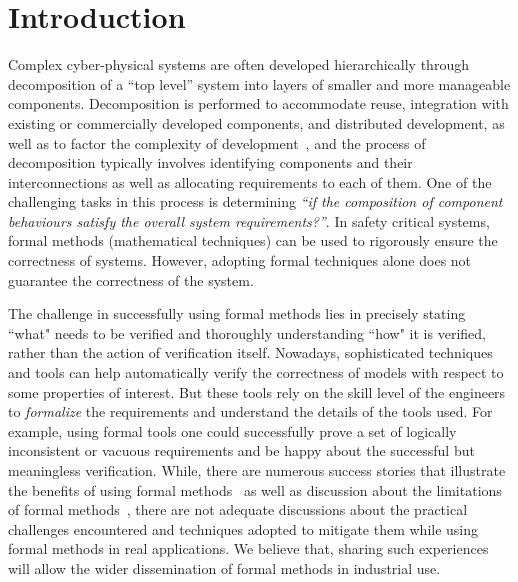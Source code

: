 \section{Introduction}
\label{sec:intro}

Complex cyber-physical systems are often developed hierarchically through decomposition of a ``top level'' system into layers of smaller and more manageable components.  Decomposition is performed to accommodate reuse, integration with existing or commercially developed components, and distributed development, as well as to factor the complexity of development~\cite{Hammond01:WiW}, and the process of decomposition typically involves identifying  components and their interconnections as well as allocating requirements to each of them. One of the challenging tasks in this process is determining \emph{``if the composition of component behaviours satisfy the overall system requirements?''}. In safety critical systems, formal methods (mathematical techniques) can be used to rigorously ensure the correctness of systems. However, adopting formal techniques alone does not guarantee the correctness of the system.

The challenge in successfully using formal methods lies in precisely stating ``what" needs to be verified and thoroughly understanding ``how" it is verified, rather than the action of verification itself. Nowadays, sophisticated techniques and tools can help automatically verify the correctness of models with respect to some properties of interest.  But these tools rely on the skill level of the engineers to \emph{formalize} the requirements and understand the details of the tools used. For example, using formal tools one could successfully prove a set of logically inconsistent or vacuous requirements and be happy about the successful but meaningless verification. While, there are numerous success stories that illustrate the benefits of using formal methods~\cite{Miller03:shalls,Whalen07:FMICS} as well as discussion about the limitations of formal methods~\cite{Limits of Formal Methods,Ralf Kneuper and myths about FM}, there are not adequate discussions about the practical challenges encountered and techniques adopted to mitigate them while using formal methods in real applications. We believe that, sharing such experiences will allow the wider dissemination of formal methods in industrial use.

